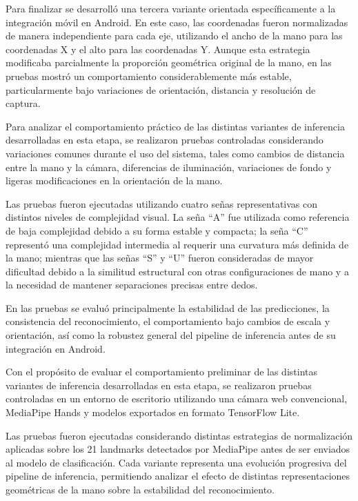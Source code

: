 	Para finalizar se desarrolló una tercera variante orientada específicamente a la integración móvil en Android. En este caso, las coordenadas fueron normalizadas de manera independiente para cada eje, utilizando el ancho de la mano para las coordenadas X y el alto para las coordenadas Y. Aunque esta estrategia modificaba parcialmente la proporción geométrica original de la mano, en las pruebas mostró un comportamiento considerablemente más estable, particularmente bajo variaciones de orientación, distancia y resolución de captura.
	
	
	Para analizar el comportamiento práctico de las distintas variantes de inferencia desarrolladas en esta etapa, se realizaron pruebas controladas considerando variaciones comunes durante el uso del sistema, tales como cambios de distancia entre la mano y la cámara, diferencias de iluminación, variaciones de fondo y ligeras modificaciones en la orientación de la mano.
	
	Las pruebas fueron ejecutadas utilizando cuatro señas representativas con distintos niveles de complejidad visual. La seña ``A'' fue utilizada como referencia de baja complejidad debido a su forma estable y compacta; la seña ``C'' representó una complejidad intermedia al requerir una curvatura más definida de la mano; mientras que las señas ``S'' y ``U'' fueron consideradas de mayor dificultad debido a la similitud estructural con otras configuraciones de mano y a la necesidad de mantener separaciones precisas entre dedos.
	
	En las pruebas se evaluó principalmente la estabilidad de las predicciones, la consistencia del reconocimiento, el comportamiento bajo cambios de escala y orientación, así como la robustez general del pipeline de inferencia antes de su integración en Android.
	
	Con el propósito de evaluar el comportamiento preliminar de las distintas variantes de inferencia desarrolladas en esta etapa, se realizaron pruebas controladas en un entorno de escritorio utilizando una cámara web convencional, MediaPipe Hands y modelos exportados en formato TensorFlow Lite. 
	
	Las pruebas fueron ejecutadas considerando distintas estrategias de normalización aplicadas sobre los 21 landmarks detectados por MediaPipe antes de ser enviados al modelo de clasificación. Cada variante representa una evolución progresiva del pipeline de inferencia, permitiendo analizar el efecto de distintas representaciones geométricas de la mano sobre la estabilidad del reconocimiento.
	
